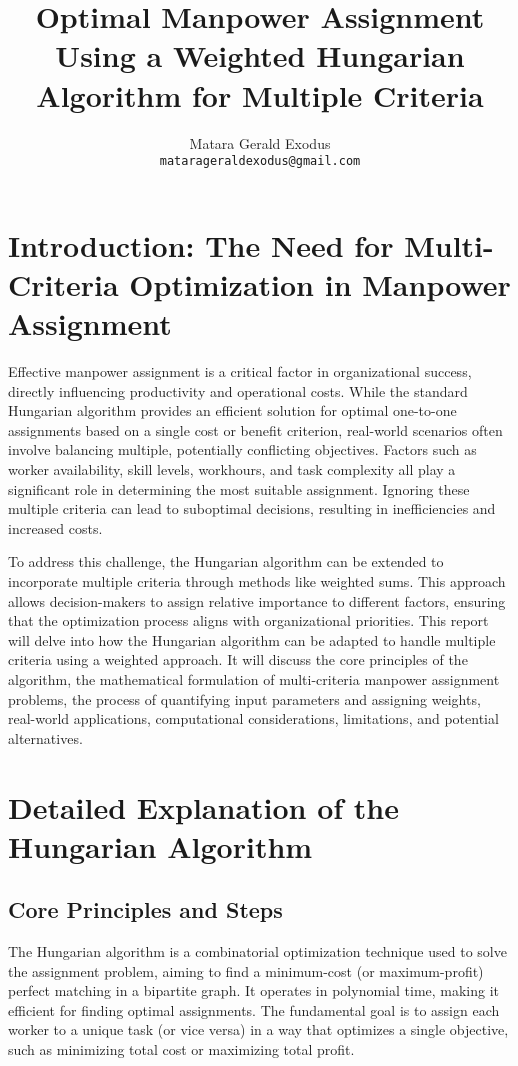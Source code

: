 \documentclass{article}
\title{Optimal Manpower Assignment Using a Weighted Hungarian Algorithm for Multiple Criteria}
\author{Matara Gerald Exodus\\
\texttt{matarageraldexodus@gmail.com}}
\date{}
\begin{document}
\maketitle

\section{Introduction: The Need for Multi-Criteria Optimization in Manpower Assignment}

Effective manpower assignment is a critical factor in organizational success, directly influencing productivity and operational costs. While the standard Hungarian algorithm provides an efficient solution for optimal one-to-one assignments based on a single cost or benefit criterion, real-world scenarios often involve balancing multiple, potentially conflicting objectives. Factors such as worker availability, skill levels, workhours, and task complexity all play a significant role in determining the most suitable assignment. Ignoring these multiple criteria can lead to suboptimal decisions, resulting in inefficiencies and increased costs.

To address this challenge, the Hungarian algorithm can be extended to incorporate multiple criteria through methods like weighted sums. This approach allows decision-makers to assign relative importance to different factors, ensuring that the optimization process aligns with organizational priorities. This report will delve into how the Hungarian algorithm can be adapted to handle multiple criteria using a weighted approach. It will discuss the core principles of the algorithm, the mathematical formulation of multi-criteria manpower assignment problems, the process of quantifying input parameters and assigning weights, real-world applications, computational considerations, limitations, and potential alternatives.

\section{Detailed Explanation of the Hungarian Algorithm}

\subsection{Core Principles and Steps}

The Hungarian algorithm is a combinatorial optimization technique used to solve the assignment problem, aiming to find a minimum-cost (or maximum-profit) perfect matching in a bipartite graph. It operates in polynomial time, making it efficient for finding optimal assignments. The fundamental goal is to assign each worker to a unique task (or vice versa) in a way that optimizes a single objective, such as minimizing total cost or maximizing total profit.
\end{document}
